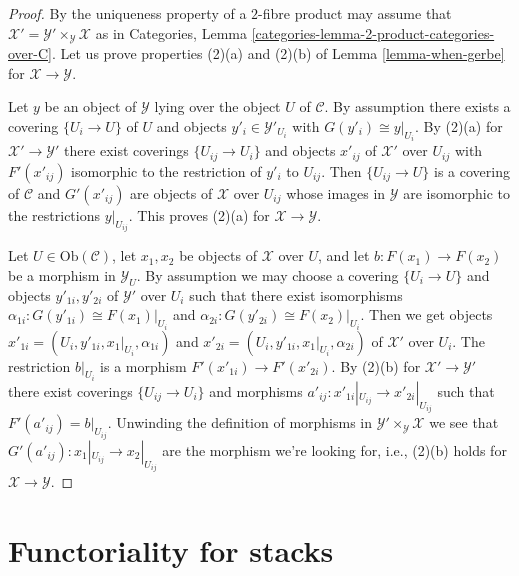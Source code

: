 \begin{proof}
By the uniqueness property of a $2$-fibre product may assume that
$\mathcal{X}' = \mathcal{Y}' \times_\mathcal{Y} \mathcal{X}$
as in
Categories, Lemma \ref{categories-lemma-2-product-categories-over-C}.
Let us prove properties (2)(a) and (2)(b) of
Lemma \ref{lemma-when-gerbe}
for $\mathcal{X} \to \mathcal{Y}$.

\medskip\noindent
Let $y$ be an object of $\mathcal{Y}$ lying over the object $U$
of $\mathcal{C}$. By assumption there exists
a covering $\{U_i \to U\}$ of $U$ and objects
$y'_i \in \mathcal{Y}'_{U_i}$ with $G(y'_i) \cong y|_{U_i}$.
By (2)(a) for $\mathcal{X}' \to \mathcal{Y}'$ there exist
coverings $\{U_{ij} \to U_i\}$ and objects $x'_{ij}$ of
$\mathcal{X}'$ over $U_{ij}$ with $F'(x'_{ij})$ isomorphic
to the restriction of $y'_i$ to $U_{ij}$. Then
$\{U_{ij} \to U\}$ is a covering of $\mathcal{C}$ and
$G'(x'_{ij})$ are objects of $\mathcal{X}$ over $U_{ij}$
whose images in $\mathcal{Y}$ are isomorphic to the restrictions
$y|_{U_{ij}}$. This proves (2)(a) for $\mathcal{X} \to \mathcal{Y}$.

\medskip\noindent
Let $U \in \text{Ob}(\mathcal{C})$, let $x_1, x_2$ be objects of
$\mathcal{X}$ over $U$, and let $b : F(x_1) \to F(x_2)$ be a morphism
in $\mathcal{Y}_U$. By assumption we may choose a covering
$\{U_i \to U\}$ and objects $y'_{1i}, y'_{2i}$ of $\mathcal{Y}'$
over $U_i$ such that there exist isomorphisms
$\alpha_{1i} : G(y'_{1i}) \cong F(x_1)|_{U_i}$ and
$\alpha_{2i} : G(y'_{2i}) \cong F(x_2)|_{U_i}$.
Then we get objects $x'_{1i} = (U_i, y'_{1i}, x_1|_{U_i}, \alpha_{1i})$ and
$x'_{2i} = (U_i, y'_{1i}, x_1|_{U_i}, \alpha_{2i})$ of
$\mathcal{X}'$ over $U_i$. The restriction $b|_{U_i}$ is a
morphism $F'(x'_{1i}) \to F'(x'_{2i})$. By (2)(b) for
$\mathcal{X}' \to \mathcal{Y}'$ there exist coverings
$\{U_{ij} \to U_i\}$ and morphisms
$a'_{ij} : x'_{1i}|_{U_{ij}} \to x'_{2i}|_{U_{ij}}$
such that $F'(a'_{ij}) = b|_{U_{ij}}$. Unwinding the definition
of morphisms in $\mathcal{Y}' \times_\mathcal{Y} \mathcal{X}$
we see that $G'(a'_{ij}) : x_1|_{U_{ij}} \to x_2|_{U_{ij}}$ are
the morphism we're looking for, i.e., (2)(b) holds for
$\mathcal{X} \to \mathcal{Y}$.
\end{proof}






\section{Functoriality for stacks}
\label{section-inverse-image}

